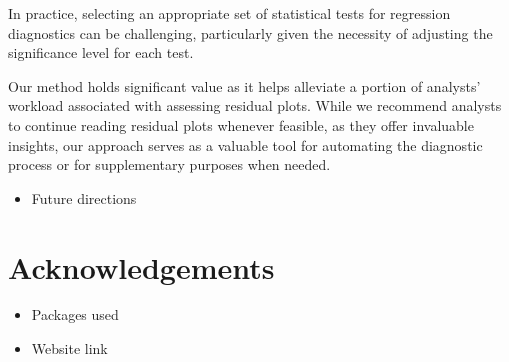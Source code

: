 \documentclass[]{interact}
\theoremstyle{plain}%
\theoremstyle{definition}
\theoremstyle{remark}
\providecommand{\tightlist}{%
  \setlength{\itemsep}{0pt}\setlength{\parskip}{0pt}}
\def\tightlist{}
\begin{document}
In practice, selecting an appropriate set of statistical tests for
regression diagnostics can be challenging, particularly given the
necessity of adjusting the significance level for each test.

Our method holds significant value as it helps alleviate a portion of
analysts' workload associated with assessing residual plots. While we
recommend analysts to continue reading residual plots whenever feasible,
as they offer invaluable insights, our approach serves as a valuable
tool for automating the diagnostic process or for supplementary purposes
when needed.

\begin{itemize}
\tightlist
\item
  Future directions
\end{itemize}

\hypertarget{acknowledgements}{%
\section*{Acknowledgements}\label{acknowledgements}}

\begin{itemize}
\tightlist
\item
  Packages used
\item
  Website link
\end{itemize}



\end{document}
